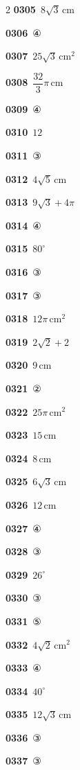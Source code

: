 \documentclass[10pt,a4paper]{article}
\begin{document}
\begin{multicols}{2}
\noindent\textbf{0305}\ $8\sqrt{3}\,\mathrm{cm}$\par
\noindent\textbf{0306}\ ④\par
\noindent\textbf{0307}\ $25\sqrt{3}\,\mathrm{cm}^2$\par
\noindent\textbf{0308}\ $\dfrac{32}{3}\pi\,\mathrm{cm}$\par
\noindent\textbf{0309}\ ④\par
\noindent\textbf{0310}\ $12$\par
\noindent\textbf{0311}\ ③\par
\noindent\textbf{0312}\ $4\sqrt{5}\,\mathrm{cm}$\par
\noindent\textbf{0313}\ $9\sqrt{3}+4\pi$\par
\noindent\textbf{0314}\ ④\par
\noindent\textbf{0315}\ $80^\circ$\par
\noindent\textbf{0316}\ ③\par
\noindent\textbf{0317}\ ③\par
\noindent\textbf{0318}\ $12\pi\,\mathrm{cm}^2$\par
\noindent\textbf{0319}\ $2\sqrt{2}+2$\par
\noindent\textbf{0320}\ $9\,\mathrm{cm}$\par
\noindent\textbf{0321}\ ②\par
\noindent\textbf{0322}\ $25\pi\,\mathrm{cm}^2$\par
\noindent\textbf{0323}\ $15\,\mathrm{cm}$\par
\noindent\textbf{0324}\ $8\,\mathrm{cm}$\par
\noindent\textbf{0325}\ $6\sqrt{3}\,\mathrm{cm}$\par
\noindent\textbf{0326}\ $12\,\mathrm{cm}$\par
\noindent\textbf{0327}\ ④\par
\noindent\textbf{0328}\ ③\par
\noindent\textbf{0329}\ $26^\circ$\par
\noindent\textbf{0330}\ ③\par
\noindent\textbf{0331}\ ⑤\par
\noindent\textbf{0332}\ $4\sqrt{2}\,\mathrm{cm}^2$\par
\noindent\textbf{0333}\ ④\par
\noindent\textbf{0334}\ $40^\circ$\par
\noindent\textbf{0335}\ $12\sqrt{3}\,\mathrm{cm}$\par
\noindent\textbf{0336}\ ③\par
\noindent\textbf{0337}\ ③\par

\end{multicols}
\end{document}
